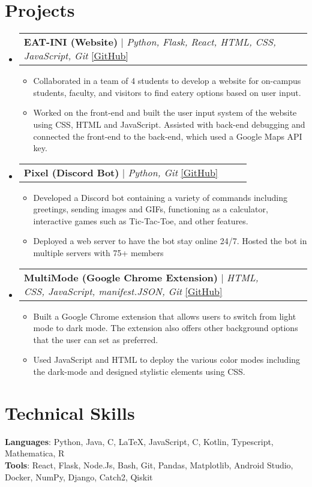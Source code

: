 \documentclass[letterpaper,11pt]{article}
\makeatletter
\newcommand{\resumeItem}[1]{
  \item\small{
    {#1 \vspace{-2pt}}
  }
}
\newcommand{\CC}{C\nolinebreak\hspace{-.05em}\raisebox{.4ex}{\tiny\bf +}\nolinebreak\hspace{-.10em}\raisebox{.4ex}{\tiny\bf +}}
\def\CC{{C\nolinebreak[4]\hspace{-.05em}\raisebox{.4ex}{\tiny\bf ++}}}
\newcommand{\resumeProjectHeading}[2]{
    \item
    \begin{tabular*}{0.97\textwidth}{l@{\extracolsep{\fill}}r}
      \small#1 & #2 \\
    \end{tabular*}\vspace{-7pt}
}
\newcommand{\resumeSubHeadingListStart}{\begin{itemize}[leftmargin=0.15in, label={}]}
\newcommand{\resumeSubHeadingListEnd}{\end{itemize}}
\newcommand{\resumeItemListStart}{\begin{itemize}}
\newcommand{\resumeItemListEnd}{\end{itemize}\vspace{-5pt}}
\makeatother
\begin{document}
\section{Projects}
    \resumeSubHeadingListStart
      \resumeProjectHeading
          {\textbf{EAT-INI (Website)} $|$ \emph{Python, Flask, React, HTML, CSS, JavaScript, Git} \href{https://github.com/CS196Illinois/Group1-SP22}{\color{blue}[GitHub]}}{~~~}
          \resumeItemListStart
            \resumeItem{Collaborated in a team of 4 students to develop a website for on-campus students, faculty, and visitors to find eatery options based on user input.} 
            \resumeItem{Worked on the front-end and built the user input system of the website using CSS, HTML and JavaScript. Assisted with back-end debugging and connected the front-end to the back-end, which used a Google Maps API key.}
          \resumeItemListEnd
      \resumeProjectHeading
          {\textbf{Pixel (Discord Bot)} $|$ \emph{Python, Git} \href{https://github.com/RamGoenka/pixel}{\color{blue}[GitHub]}}{~~~}
          \resumeItemListStart
            \resumeItem{Developed a Discord bot containing a variety of commands including greetings, sending images and GIFs, functioning as a calculator, interactive games such as Tic-Tac-Toe, and other features.}
            \resumeItem{Deployed a web server to have the bot stay online 24/7. Hosted the bot in multiple servers with 75+ members}
            
          \resumeItemListEnd
        \resumeProjectHeading
          {\textbf{MultiMode (Google Chrome Extension)} $|$ \emph{HTML, CSS, JavaScript, manifest.JSON, Git} \href{https://github.com/RamGoenka/MutliMode}{\color{blue}[GitHub]}}{~~~}
          \resumeItemListStart
            \resumeItem{Built a Google Chrome extension that allows users to switch from light mode to dark mode. The extension also offers other background options that the user can set as preferred.}
            \resumeItem{Used JavaScript and HTML to deploy the various color modes including the dark-mode and designed stylistic elements using CSS.}
            \resumeItemListEnd
    \resumeSubHeadingListEnd
    
\section{Technical Skills}
 \begin{itemize}[leftmargin=0.10in, label={}]
    \small{\item{
     \textbf{Languages}{: Python, Java, \CC, \LaTeX, JavaScript, C, Kotlin, Typescript, Mathematica, R} \\
     \textbf{Tools}{: React, Flask, Node.Js, Bash, Git, Pandas, Matplotlib, Android Studio, Docker, NumPy, Django, Catch2, Qiskit} 
    }}
 \end{itemize}
\end{document}
